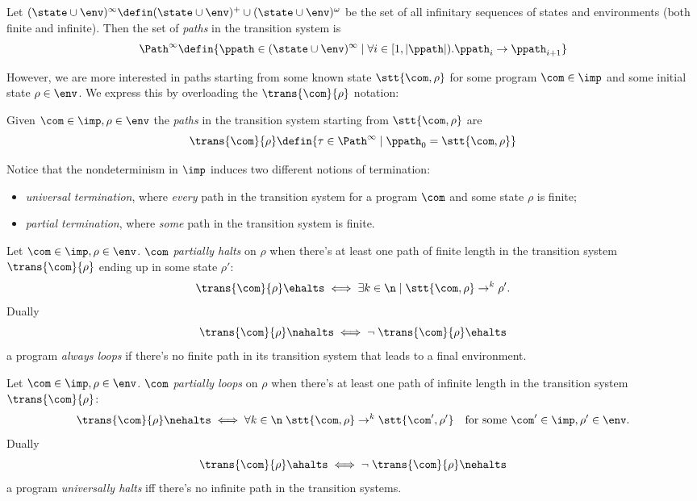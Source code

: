 \begin{definition}[Paths]
  Let \((\state \cup \env)^\infty \defin (\state \cup \env)^+ \cup
  (\state \cup \env)^\omega\) be the set of all infinitary sequences
  of states and environments (both finite and infinite). Then the set
  of \emph{paths} in the transition system is \[\Path^\infty \defin
  \{\ppath \in (\state \cup \env)^\infty \mid \forall i \in [ 1, |
    \ppath | ) . \ppath_i \to \ppath_{i+1}\}\]
\end{definition}
\noindent
However, we are more interested in paths starting from some known
state \(\stt{\com, \rho}\) for some program \(\com\in\imp\) and some
initial state \(\rho \in \env\). We express this by overloading the
\(\trans{\com}{\rho}\) notation:
\begin{definition}
  Given \(\com \in \imp, \rho\in\env\) the \emph{paths} in the
  transition system starting from \(\stt{\com, \rho}\)
  are \[\trans{\com}{\rho} \defin \{\tau \in \Path^\infty \mid
  \ppath_0 = \stt{\com, \rho}\}\]
\end{definition}
\noindent
Notice that the nondeterminism in \(\imp\) induces two different
notions of termination:
\begin{itemize}
\item \emph{universal termination}, where \emph{every} path in the
  transition system for a program \(\com\) and some state \(\rho\) is
  finite;
\item \emph{partial termination}, where \emph{some} path in the
  transition system is finite.
\end{itemize}
\begin{definition}
  Let \(\com \in \imp, \rho \in \env\). \(\com\) \emph{partially
    halts} on \(\rho\) when there's at least one path of finite length
  in the transition system \(\trans{\com}{\rho}\) ending up in some
  state \(\rho'\):
  \[ \trans{\com}{\rho} \ehalts \iff \exists k \in \n \mid \stt{\com,
      \rho} \to^k \rho'.\] Dually
  \[ \trans{\com}{\rho} \nahalts \iff \neg \; \trans{\com}{\rho}
    \ehalts \] a program \emph{always loops} if there's no finite path
  in its transition system that leads to a final environment.
\end{definition}
\begin{definition}
  Let \(\com \in \imp, \rho \in \env\). \(\com\) \emph{partially
    loops} on \(\rho\) when there's at least one path of infinite
  length in the transition system \(\trans{\com}{\rho}\):
  \[ \trans{\com}{\rho} \nehalts \iff \forall k \in \n \; \stt{\com,
      \rho} \to^k \stt{\com', \rho'} \quad \text{for some }
    \com'\in\imp, \rho'\in\env.\] Dually
  \begin{equation*}
    \trans{\com}{\rho} \ahalts \iff \neg \; \trans{\com}{\rho}
    \nehalts
  \end{equation*}
  a program \emph{universally halts} iff there's no infinite path in
  the transition systems.
\end{definition}

